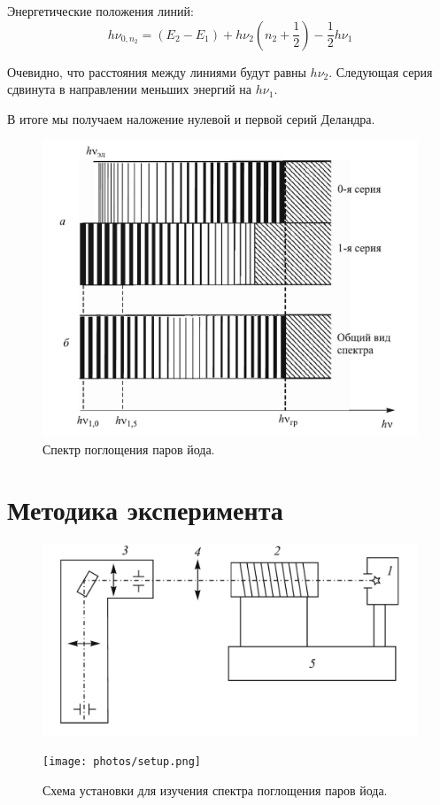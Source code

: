 \documentclass[12pt,a4paper]{article}
\begin{document}
	Энергетические положения линий:
	\begin{equation}
		h \nu_{0, n_2} = (E_2 - E_1) + h \nu_2 (n_2 + \frac{1}{2}) - \frac{1}{2} h \nu_1
		\label{eq:lines}
	\end{equation}
	
	Очевидно, что расстояния между линиями будут равны $h \nu_2$. Следующая серия сдвинута в направлении меньших энергий на $h \nu_1$.
	
	В итоге мы получаем наложение нулевой и первой серий Деландра.
	
	\begin{figure}[H]
		\centering
		\includegraphics[width=0.6\linewidth]{res/spectrum.png}
		\caption{Спектр поглощения паров йода.}
		\label{fig:spectrum}
	\end{figure}
	
	\section*{Методика эксперимента}
	
	\begin{figure}[H]
		\centering
		\begin{minipage}{0.4\textwidth}
			\centering
			\includegraphics[width=0.9\linewidth]{res/setup.png}
		\end{minipage}%
		\begin{minipage}{0.6\textwidth}
			\centering
			\texttt{[image: photos/setup.png]}
		\end{minipage}
		\caption{Схема установки для изучения спектра поглощения паров йода.}
		\label{fig:coil}
	\end{figure}
	
\end{document}
